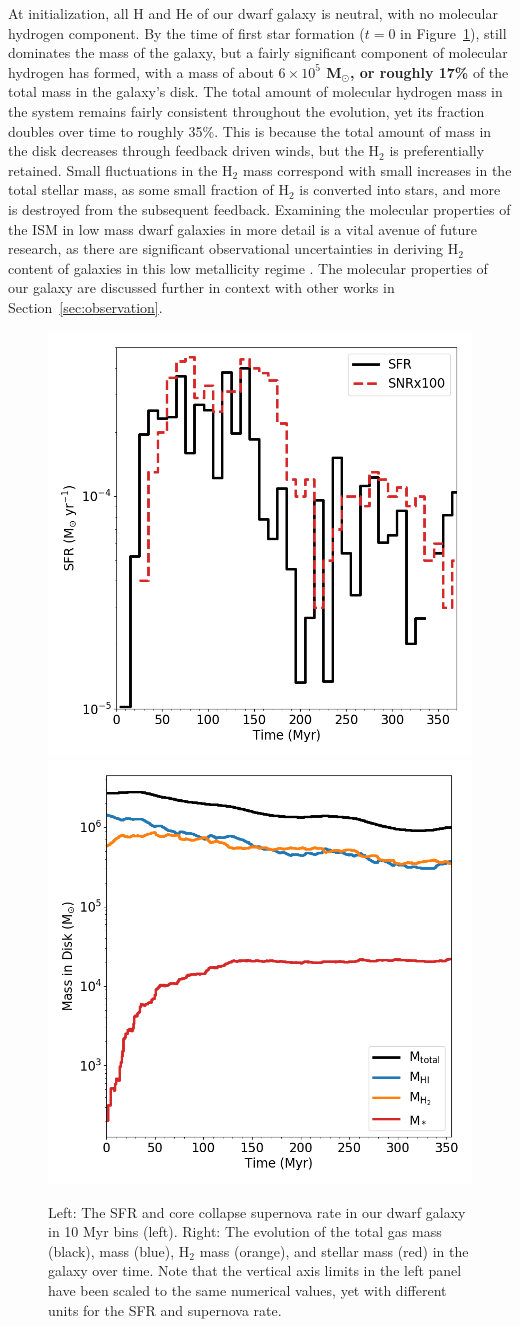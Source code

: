 \documentclass[twocolumn]{aastex61}
\begin{document}
At initialization, all H and He of our dwarf galaxy is neutral, with no molecular hydrogen component. By the time of first star formation ($t=0$ in Figure~\ref{fig:sfr_mass_evolution}),  still dominates the mass of the galaxy, but a fairly significant component of molecular hydrogen has formed, with a mass of about \textbf{$6 \times 10^5$ M$_{\odot}$, or roughly 17\%} of the total mass in the galaxy's disk. The total amount of molecular hydrogen mass in the system remains fairly consistent throughout the evolution, yet its fraction doubles over time to roughly 35\%. This is because the total amount of mass in the disk decreases through feedback driven winds, but the H$_2$ is preferentially retained. Small fluctuations in the H$_2$ mass correspond with small increases in the total stellar mass, as some small fraction of H$_2$ is converted into stars, and more is destroyed from the subsequent feedback. Examining the molecular properties of the ISM in low mass dwarf galaxies in more detail is a vital avenue of future research, as there are significant observational uncertainties in deriving H$_2$ content of galaxies in this low metallicity regime \citep{Leroy2008,McQuinn2012,Amorin2016}. The molecular properties of our galaxy are discussed further in context with other works in Section~\ref{sec:observation}. 

\begin{figure}
\centering
\includegraphics[width=0.475\linewidth]{sfr_snr}
\includegraphics[width=0.475\linewidth]{mass_evolution}
\caption{Left: The SFR and core collapse supernova rate in our dwarf galaxy in 10 Myr bins (left). Right: The evolution of the total gas mass (black),  mass (blue), H$_2$ mass (orange), and stellar mass (red) in the galaxy over time. Note that the vertical axis limits in the left panel have been scaled to the same numerical values, yet with different units for the SFR and supernova rate.}
\label{fig:sfr_mass_evolution}
\end{figure}
\end{document}
